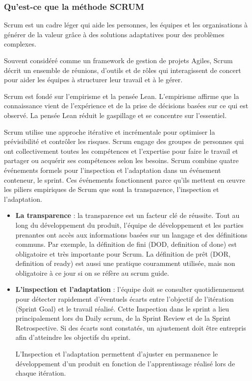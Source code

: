 \subsubsection{Qu’est-ce que la méthode SCRUM}

Scrum est un cadre léger qui aide les personnes, les équipes et les organisations à générer de la valeur grâce à
des solutions adaptatives pour des problèmes complexes\cite{schwaber2011scrum}.

Souvent considéré comme un framework de gestion de projets Agiles, Scrum décrit un ensemble de réunions, d'outils et de rôles qui interagissent de concert pour aider les équipes à structurer leur travail et à le gérer.

Scrum est fondé sur l'empirisme et la pensée Lean. L'empirisme affirme que la connaissance vient de l'expérience et de la prise de décisions basées sur ce qui est observé. La pensée Lean réduit le gaspillage et se concentre sur l'essentiel\cite{schwaber2011scrum}.

Scrum utilise une approche itérative et incrémentale pour optimiser la prévisibilité et contrôler les risques. Scrum engage des groupes de personnes qui ont collectivement toutes les compétences et l'expertise pour faire le travail et partager ou acquérir ses compétences selon les besoins. Scrum combine quatre événements formels pour l'inspection et l'adaptation dans un événement conteneur, le sprint. Ces événements fonctionnent parce qu'ils mettent en œuvre les piliers empiriques de Scrum que sont la transparence, l'inspection et l'adaptation.

\vspace{1em}
\begin{itemize}
	\setlength\itemsep{1em}
	\item \textbf{La transparence} : la transparence est un facteur clé de réussite. Tout au long du développement du produit, l’équipe de développement et les parties prenantes ont accès aux informations basées sur un langage et des définitions communs. Par exemple, la définition de fini (DOD, definition of done) est obligatoire et très importante pour Scrum. La définition de prêt (DOR, definition of ready) est aussi une pratique couramment utilisée, mais non obligatoire à ce jour si on se réfère au scrum guide.
	\item \textbf{L'inspection et l'adaptation} : l’équipe doit se consulter quotidiennement pour détecter rapidement d’éventuels écarts entre l’objectif de l’itération (Sprint Goal) et le travail réalisé. Cette Inspection dans le sprint a lieu principalement lors du Daily scrum, de la Sprint Review et de la Sprint Retrospective. Si des écarts sont constatés, un ajustement doit être entrepris afin d’atteindre les objectifs du sprint.

	      L’Inspection et l’adaptation permettent d’ajuster en permanence le développement d’un produit en fonction de l’apprentissage réalisé lors de chaque itération.
\end{itemize}

